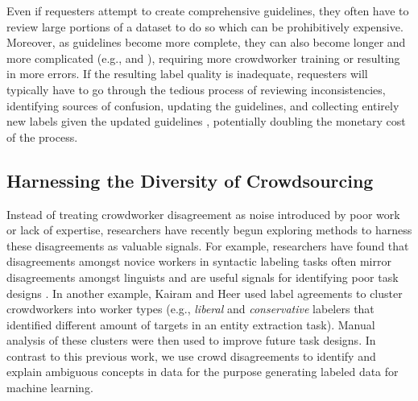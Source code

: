 Even if requesters attempt to create comprehensive guidelines, they often have to review large portions of a dataset to do so which can be prohibitively expensive. Moreover, as guidelines become more complete, they can also become longer and more complicated (e.g., \cite{google} and \cite{bing}), requiring more crowdworker training or resulting in more errors. If the resulting label quality is inadequate, requesters will typically have to go through the tedious process of reviewing inconsistencies, identifying sources of confusion, updating the guidelines, and collecting entirely new labels given the updated guidelines \cite{kulesza2014structured}, potentially doubling the monetary cost of the process. 

\subsection{Harnessing the Diversity of Crowdsourcing}
Instead of treating crowdworker disagreement as noise introduced by poor work or lack of expertise, researchers have recently begun exploring methods to harness these disagreements as valuable signals. For example, researchers have found that disagreements amongst novice workers in syntactic labeling tasks often mirror disagreements amongst linguists \cite{plank2014linguistically} and are useful signals for identifying poor task designs \cite{inel2014crowdtruth}. %
In another example, Kairam and Heer \cite{kairam2016parting} used label agreements to cluster crowdworkers into worker types (e.g., \emph{liberal} and \emph{conservative} labelers that identified different amount of targets in an entity extraction task). Manual analysis of these clusters were then used to improve future task designs. In contrast to this previous work, we use crowd disagreements to identify and explain ambiguous concepts in data for the purpose generating labeled data for machine learning. 


